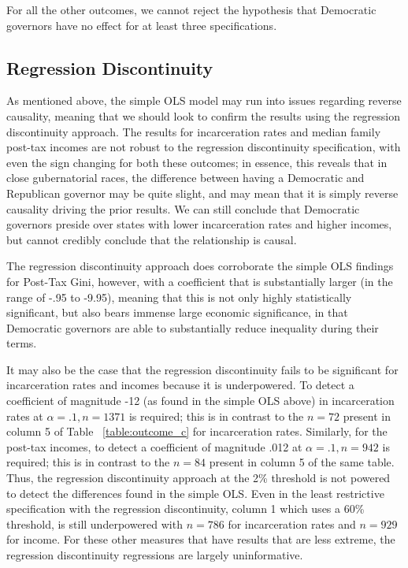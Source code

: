 \documentclass{article}
\begin{document}
For all the other outcomes, we cannot reject the hypothesis that Democratic governors have no effect for at least three specifications. 

\subsection{Regression Discontinuity}

As mentioned above, the simple OLS model may run into issues regarding reverse causality, meaning that we should look to confirm the results using the regression discontinuity approach. The results for incarceration rates and median family post-tax incomes are not robust to the regression discontinuity specification, with even the sign changing for both these outcomes; in essence, this reveals that in close gubernatorial races, the difference between having a Democratic and Republican governor may be quite slight, and may mean that it is simply reverse causality driving the prior results. We can still conclude that Democratic governors preside over states with lower incarceration rates and higher incomes, but cannot credibly conclude that the relationship is causal.

The regression discontinuity approach does corroborate the simple OLS findings for Post-Tax Gini, however, with a coefficient that is substantially larger (in the range of -.95 to -9.95), meaning that this is not only highly statistically significant, but also bears immense large economic significance, in that Democratic governors are able to substantially reduce inequality during their terms.

It may also be the case that the regression discontinuity fails to be significant for incarceration rates and incomes because it is underpowered. To detect a coefficient of magnitude -12 (as found in the simple OLS above) in incarceration rates at $\alpha = .1, n = 1371$ is required; this is in contrast to the $n = 72$  present in column 5 of Table ~\ref{table:outcome_c} for incarceration rates. Similarly, for the post-tax incomes, to detect a coefficient of magnitude .012 at $\alpha =.1, n = 942$ is required; this is in contrast to the $n = 84$ present in column 5 of the same table. Thus, the regression discontinuity approach at the 2\% threshold is not powered to detect the differences found in the simple OLS. Even in the least restrictive specification with the regression discontinuity, column 1 which uses a 60\% threshold, is still underpowered with $n = 786$ for incarceration rates and $n = 929$ for income. For these other measures that have results that are less extreme, the regression discontinuity regressions are largely uninformative. 
\end{document}
